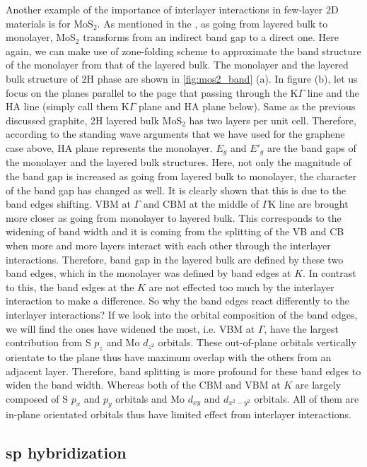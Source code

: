 Another example of the importance of interlayer interactions in few-layer 2D materials is for MoS$_2$. As mentioned in the , as going from layered bulk to monolayer, MoS$_2$ transforms from an indirect band gap to a direct one. Here again, we can make use of zone-folding scheme to approximate the band structure of the monolayer from that of the layered bulk. The monolayer and the layered bulk structure of 2H phase are shown in \autoref{fig:mos2_band} (a). In figure (b), let us focus on the planes parallel to the page that passing through the K$\Gamma$ line and the HA line (simply call them K$\Gamma$ plane and HA plane below). Same as the previous discussed graphite, 2H layered bulk MoS$_2$ has two layers per unit cell. Therefore, according to the standing wave arguments that we have used for the graphene case above, HA plane represents the monolayer. $E_g$ and $E\prime_g$ are the band gaps of the monolayer and the layered bulk structures. Here, not only the magnitude of the band gap is increased as going from layered bulk to monolayer, the character of the band gap has changed as well. It is clearly shown that this is due to the band edges shifting. VBM at $\Gamma$ and CBM at the middle of $\Gamma$K line are brought more closer as going from monolayer to layered bulk. This corresponds to the widening of band width and it is coming from the splitting of the VB and CB when more and more layers interact with each other through the interlayer interactions. Therefore, band gap in the layered bulk are defined by these two band edges, which in the monolayer was defined by band edges at $K$. In contrast to this, the band edges at the $K$ are not effected too much by the interlayer interaction to make a difference. So why the band edges react differently to the interlayer interactions? If we look into the orbital composition of the band edges, we will find the ones have widened the most, i.e. VBM at $\Gamma$, have the largest contribution from S $p_z$ and Mo $d_{z^2}$ orbitals. These out-of-plane orbitals vertically orientate to the plane thus have maximum overlap with the others from an adjacent layer. Therefore, band splitting is more profound for these band edges to widen the band width. Whereas both of the CBM and VBM at $K$ are largely composed of S $p_x$ and $p_y$ orbitals and Mo $d_{xy}$ and $d_{x^2-y^2}$ orbitals. All of them are in-plane orientated orbitals thus have limited effect from interlayer interactions\cite{Padilha2014}.

\subsection{sp hybridization}

